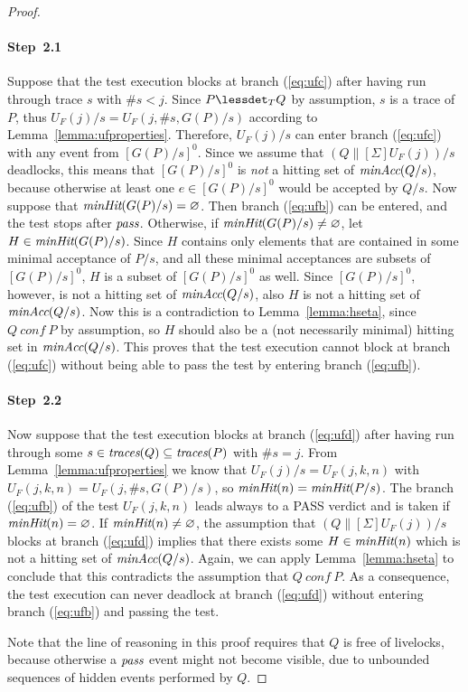 \begin{proof}{~}
\paragraph{Step~2.1} Suppose that the test execution blocks at branch (\ref{eq:ufc})
after having run through trace $s$ with $\#s < j$. Since  $P\lessdet_T Q$ by
assumption, $s$ is a trace of $P$, thus $U_F(j)/s = U_F(j,\#s,G(P)/s)$
according to Lemma~\ref{lemma:ufproperties}. Therefore, $U_F(j)/s$  can enter
branch (\ref{eq:ufc}) with any event from $[G(P)/s]^0$. Since we assume that
$(Q\parallel[\Sigma] U_F(j))/s$ deadlocks, this means that $[G(P)/s]^0$ is
{\it not} a hitting set of $\text{\it minAcc}(Q/s)$, because otherwise at least one
$e\in [G(P)/s]^0$ would be accepted by $Q/s$. Now suppose that
$\text{\it minHit}(G(P)/s) = \varnothing$. Then   branch (\ref{eq:ufb}) can be
entered, and the test stops after ${\text{\it pass}}$. Otherwise, if $\text{\it minHit}(G(P)/s)
\neq \varnothing$, let $H\in\text{\it minHit}(G(P)/s)$. Since $H$ contains only
elements that are contained in some minimal acceptance of $P/s$, and all
these minimal acceptances are subsets of $[G(P)/s]^0$, $H$ is a subset of
$[G(P)/s]^0$ as well. Since $[G(P)/s]^0$, however, is not a hitting set of
$\text{\it minAcc}(Q/s)$, also $H$ is not a hitting set of $\text{\it minAcc}(Q/s)$. Now this
is a contradiction to Lemma~\ref{lemma:hseta}, since $Q\ conf\ P$ by
assumption, so $H$ should also be a (not necessarily minimal) hitting set in
$\text{\it minAcc}(Q/s)$. This proves that the test execution cannot block  at branch
(\ref{eq:ufc}) without being able to pass the test by entering branch
(\ref{eq:ufb}).

\paragraph{Step~2.2} Now suppose that the test execution blocks at
branch (\ref{eq:ufd}) after having run through some $s\in\text{\it traces}(Q)\subseteq \text{\it traces}(P)$
with $\#s = j$.
From Lemma~\ref{lemma:ufproperties} we know
that $U_F(j)/s = U_F(j,k,n)$ with $U_F(j,k,n) = U_F(j,\#s,G(P)/s)$, so
$\text{\it minHit}(n) = \text{\it minHit}(P/s)$. The branch (\ref{eq:ufb}) of the test
$U_F(j,k,n)$ leads always to a PASS verdict and is taken if $\text{\it minHit}(n) =
\varnothing$.
If $\text{\it minHit}(n) \neq \varnothing$,  the assumption that $(Q\parallel[\Sigma] U_F(j))/s$
blocks at branch (\ref{eq:ufd}) implies that there exists some $H\in\text{\it minHit}(n)$
which is not a hitting set of $\text{\it minAcc}(Q/s)$. Again, we can apply Lemma~\ref{lemma:hseta}
to conclude that this contradicts the assumption that $Q\ conf\ P$. As a consequence,
the test execution can never deadlock at branch (\ref{eq:ufd}) without entering
branch (\ref{eq:ufb}) and passing the test.


Note that the line of reasoning in this proof requires that $Q$ is free of
livelocks, because otherwise a ${\text{\it pass}}$ event might not become visible,
due to unbounded sequences of hidden events performed by $Q$.
\xbox
\end{proof}
